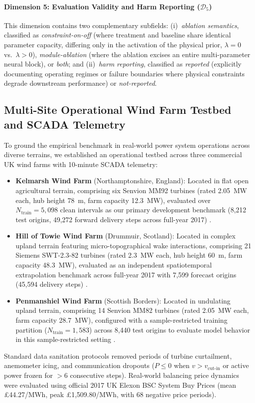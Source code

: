 \paragraph{Dimension 5: Evaluation Validity and Harm Reporting ($\mathcal{D}_5$)}
This dimension contains two complementary subfields: (i)~\textit{ablation semantics}, classified as \textit{constraint-on-off} (where treatment and baseline share identical parameter capacity, differing only in the activation of the physical prior, $\lambda=0$ vs.\ $\lambda>0$), \textit{module-ablation} (where the ablation excises an entire multi-parameter neural block), or \textit{both}; and (ii)~\textit{harm reporting}, classified as \textit{reported} (explicitly documenting operating regimes or failure boundaries where physical constraints degrade downstream performance) or \textit{not-reported}.

\subsection{Multi-Site Operational Wind Farm Testbed and SCADA Telemetry}
To ground the empirical benchmark in real-world power system operations across diverse terrains, we established an operational testbed across three commercial UK wind farms with 10-minute SCADA telemetry:
\begin{itemize}[leftmargin=*]
\item \textbf{Kelmarsh Wind Farm} (Northamptonshire, England): Located in flat open agricultural terrain, comprising six Senvion MM92 turbines (rated 2.05~MW each, hub height 78~m, farm capacity 12.3~MW), evaluated over $N_{\text{train}} = 5,098$ clean intervals as our primary development benchmark (8,212 test origins, 49,272 forward delivery steps across full-year 2017) \cite{zenodo_kelmarsh}.
\item \textbf{Hill of Towie Wind Farm} (Drummuir, Scotland): Located in complex upland terrain featuring micro-topographical wake interactions, comprising 21 Siemens SWT-2.3-82 turbines (rated 2.3~MW each, hub height 60~m, farm capacity 48.3~MW), evaluated as an independent spatiotemporal extrapolation benchmark across full-year 2017 with 7,599 forecast origins (45,594 delivery steps) \cite{zenodo_hilloftowie}.
\item \textbf{Penmanshiel Wind Farm} (Scottish Borders): Located in undulating upland terrain, comprising 14 Senvion MM82 turbines (rated 2.05~MW each, farm capacity 28.7~MW), configured with a sample-restricted training partition ($N_{\text{train}} = 1,583$) across 8,440 test origins to evaluate model behavior in this sample-restricted setting \cite{zenodo_penmanshiel}.
\end{itemize}
Standard data sanitation protocols removed periods of turbine curtailment, anemometer icing, and communication dropouts ($P \le 0$ when $v > v_{\text{cut-in}}$ or active power frozen for $>6$ consecutive steps). Real-world balancing price dynamics were evaluated using official 2017 UK Elexon BSC System Buy Prices (mean \pounds 44.27/MWh, peak \pounds 1,509.80/MWh, with 68 negative price periods).

